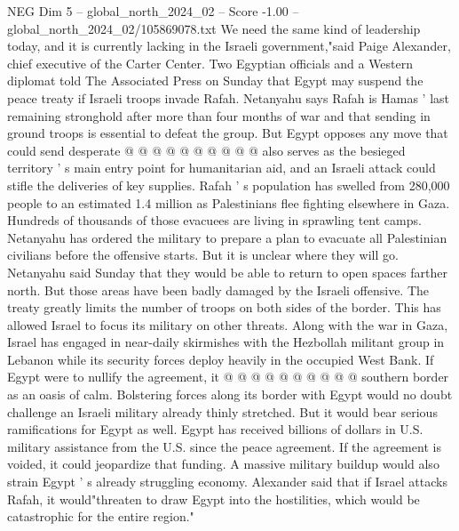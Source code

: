 \begin{textsample}{NEG Dim 5 – global\_north\_2024\_02 – Score -1.00 – global\_north\_2024\_02/105869078.txt}
We need the same kind of leadership today, and it is currently lacking in the Israeli government,"said Paige Alexander, chief executive of the Carter Center.
Two Egyptian officials and a Western diplomat told The Associated Press on Sunday that Egypt may suspend the peace treaty if Israeli troops invade Rafah.
Netanyahu says Rafah is Hamas ' last remaining stronghold after more than four months of war and that sending in ground troops is essential to defeat the group.
But Egypt opposes any move that could send desperate @ @ @ @ @ @ @ @ @ @ also serves as the besieged territory ' s main entry point for humanitarian aid, and an Israeli attack could stifle the deliveries of key supplies.
Rafah ' s population has swelled from 280,000 people to an estimated 1.4 million as Palestinians flee fighting elsewhere in Gaza.
Hundreds of thousands of those evacuees are living in sprawling tent camps.
Netanyahu has ordered the military to prepare a plan to evacuate all Palestinian civilians before the offensive starts.
But it is unclear where they will go.
Netanyahu said Sunday that they would be able to return to open spaces farther north.
But those areas have been badly damaged by the Israeli offensive.
The treaty greatly limits the number of troops on both sides of the border.
This has allowed Israel to focus its military on other threats.
Along with the war in Gaza, Israel has engaged in near-daily skirmishes with the Hezbollah militant group in Lebanon while its security forces deploy heavily in the occupied West Bank.
If Egypt were to nullify the agreement, it @ @ @ @ @ @ @ @ @ @ southern border as an oasis of calm.
Bolstering forces along its border with Egypt would no doubt challenge an Israeli military already thinly stretched.
But it would bear serious ramifications for Egypt as well.
Egypt has received billions of dollars in U.S. military assistance from the U.S. since the peace agreement.
If the agreement is voided, it could jeopardize that funding.
A massive military buildup would also strain Egypt ' s already struggling economy.
Alexander said that if Israel attacks Rafah, it would"threaten to draw Egypt into the hostilities, which would be catastrophic for the entire region."

\end{textsample}
